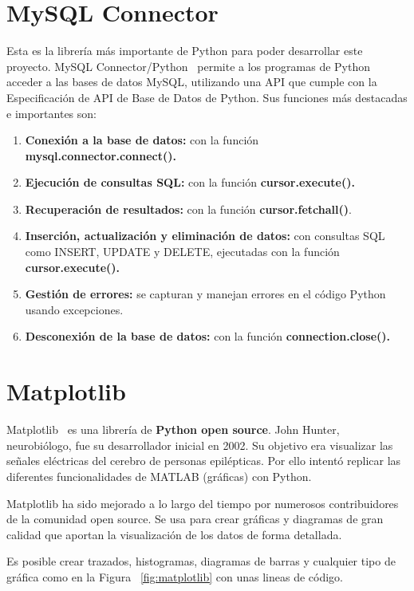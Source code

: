 \documentclass[a4paper, 12pt]{book}
\begin{document}
\section{MySQL Connector} 
\label{sec:mysqlconnector}
Esta es la librería más importante de Python para poder desarrollar este proyecto.
MySQL Connector/Python~\cite{mysql:_connectors} permite a los programas de Python acceder a las bases de datos MySQL, utilizando una API que cumple con la Especificación de API de Base de Datos de Python.
Sus funciones más destacadas e importantes son:
\begin{enumerate}
	\item \textbf{Conexión a la base de datos: }con la función \textbf{mysql.connector.connect().}
	\item \textbf{Ejecución de consultas SQL: }con la función \textbf{cursor.execute().}
	\item \textbf{Recuperación de resultados: }con la función \textbf{cursor.fetchall()}.
	\item \textbf{Inserción, actualización y eliminación de datos: }con consultas SQL como INSERT, UPDATE y DELETE, ejecutadas con la función \textbf{cursor.execute().}
	\item \textbf{Gestión de errores: }se capturan y manejan errores en el código Python usando excepciones.
	\item \textbf{Desconexión de la base de datos: }con la función \textbf{connection.close().}
\end{enumerate}

\section{Matplotlib} 
\label{sec:matplotlib}


Matplotlib~\cite{python:_matplotlib} es una librería de \textbf{Python open source}. John Hunter, neurobiólogo, fue su desarrollador inicial en 2002. Su objetivo era visualizar las señales eléctricas del cerebro de personas epilépticas. Por ello intentó replicar las diferentes funcionalidades de MATLAB (gráficas) con Python. 

Matplotlib ha sido mejorado a lo largo del tiempo por numerosos contribuidores de la comunidad open source. Se usa para crear gráficas y diagramas de gran calidad que aportan la visualización de los datos de  forma detallada.

Es posible crear trazados, histogramas, diagramas de barras y cualquier tipo de gráfica como en la Figura ~\ref{fig:matplotlib} con unas lineas de código.
\end{document}

